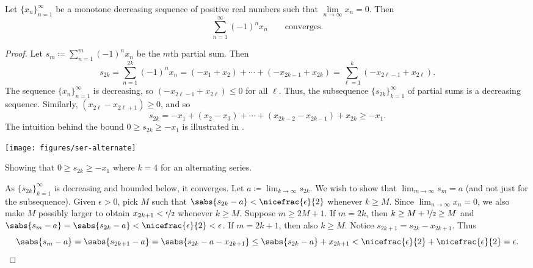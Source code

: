 \begin{prop}
Let $\{ x_n \}_{n=1}^\infty$ be a monotone decreasing sequence of positive real numbers such
that $\lim\limits_{n\to\infty} x_n = 0$.  Then
\begin{equation*}
\sum_{n=1}^\infty {(-1)}^n x_n \qquad \text{converges.}
\end{equation*}
\end{prop}

\begin{proof}
Let $s_m \coloneqq \sum_{n=1}^m {(-1)}^n x_n$ be the $m$th partial sum.  Then
\begin{equation*}
s_{2k} =
\sum_{n=1}^{2k} {(-1)}^n x_n
=
(-x_1 + x_2) + \cdots + (-x_{2k-1} + x_{2k})
=
\sum_{\ell=1}^{k} (-x_{2\ell-1} + x_{2\ell}) .
\end{equation*}
The sequence $\{ x_n \}_{n=1}^\infty$ is decreasing, so $(-x_{2\ell-1}+x_{2\ell}) \leq 0$
for all $\ell$.
Thus, the subsequence $\{ s_{2k} \}_{k=1}^\infty$ of partial sums
is a decreasing sequence.  Similarly, $(x_{2\ell}-x_{2\ell+1}) \geq 0$, and so
\begin{equation*}
s_{2k} = - x_1 + ( x_2 - x_3 ) + \cdots + ( x_{2k-2} - x_{2k-1} ) + x_{2k}
\geq -x_1 .
\end{equation*}
The intuition behind the bound
$0 \geq s_{2k} \geq -x_1$ is illustrated in .
\begin{myfigureht}
\texttt{[image: figures/ser-alternate]}
\caption{Showing that $0 \geq s_{2k} \geq -x_1$ where $k=4$ for an alternating series.\label{fig:seralternate}}
\end{myfigureht}

As $\{ s_{2k} \}_{k=1}^\infty$ is decreasing and bounded below, it converges.
Let $a \coloneqq \lim_{k\to\infty} s_{2k}$.
We wish to show that $\lim_{m\to\infty} s_m = a$ (and not just for the subsequence).
Given $\epsilon > 0$, pick $M$ such that $\sabs{s_{2k}-a} <
\nicefrac{\epsilon}{2}$ whenever $k \geq M$.
Since $\lim_{n\to\infty} x_n = 0$, we also
make $M$ possibly larger
to obtain
$x_{2k+1} < \nicefrac{\epsilon}{2}$ whenever $k \geq M$.  
Suppose $m \geq 2M+1$.  If $m=2k$, then $k \geq M+\nicefrac{1}{2} \geq M$ and
$\sabs{s_{m}-a}=\sabs{s_{2k}-a} < \nicefrac{\epsilon}{2} < \epsilon$.
If $m=2k+1$, then also $k \geq M$.  Notice
$s_{2k+1} = s_{2k} - x_{2k+1}$.
Thus
\begin{equation*}
\sabs{s_{m}-a} = 
\sabs{s_{2k+1}-a} = 
\sabs{s_{2k}-a - x_{2k+1}} \leq
\sabs{s_{2k}-a} + x_{2k+1} < 
\nicefrac{\epsilon}{2}+ \nicefrac{\epsilon}{2} = \epsilon .  \qedhere
\end{equation*}
\end{proof}

